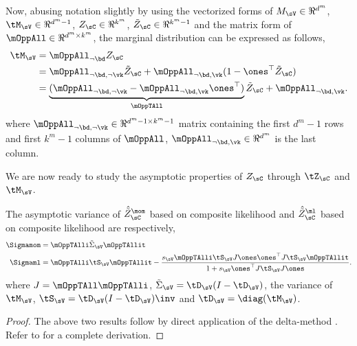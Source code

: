 Now, abusing notation slightly by using the vectorized forms of $M_\sV
\in \Re^{d^m}$, $\tM_\sV \in \Re^{d^m-1}$, $Z_\sC \in \Re^{k^m}$, $\tilde Z_\sC \in \Re^{k^m-1}$
and the matrix form of $\mOppAll \in \Re^{d^m \times k^m}$, the marginal
distribution can be expressed as follows,
\begin{align*}
  \tM_\sV 
        &= \mOppAll_{\neg \bd} Z_\sC \\
        &= \mOppAll_{\neg \bd, \neg \vk} \tilde Z_\sC + \mOppAll_{\neg \bd, \vk} (1 - \ones^\top \tilde Z_\sC) \\
        &= \underbrace{(\mOppAll_{\neg \bd, \neg \vk} -  \mOppAll_{\neg \bd, \vk}\ones^\top)}_{\mOppTAll} \tilde Z_\sC + \mOppAll_{\neg \bd, \vk}.
\end{align*}
where $\mOppAll_{\neg \bd, \neg \vk} \in \Re^{d^m -1 \times k^m - 1}$ matrix containing the
first $d^m-1$ rows and first $k^m-1$ columns of $\mOppAll$, $\mOppAll_{\neg \bd, \vk} \in \Re^{d^m}$ is the last column. 

We are now ready to study the asymptotic properties of $Z_\sC$ through
$\tZ_\sC$ and $\tM_\sV$.

\providecommand{\hatt}[1] {\hat{\tilde{#1}}}
\begin{lemma}
  \label{lem:mom-pw-variance}
  The asymptotic variance of $\hatt Z^\mom_{\sC}$ based on composite likelihood and 
  $\hatt Z^\ml_{\sC}$ based on composite likelihood are respectively,
  \begin{align*}
    \Sigmamom &= \mOppTAlli \tilde\Sigma_\sV \mOppTAllit \\
    \Sigmaml 
    &= \mOppTAlli \tS_\sV \mOppTAllit 
      - \frac{s_\sV \mOppTAlli \tS_\sV J \ones \ones^\top J \tS_\sV \mOppTAllit }
      {1 + s_\sV \ones^\top J \tS_\sV J \ones}.
  \end{align*}
  where $J = \mOppTAll \mOppTAlli$, $\tilde \Sigma_\sV = \tD_\sV (I
  - \tD_\sV)$, the variance of $\tM_\sV$, $\tS_\sV = \tD_\sV (I
  - \tD_\sV)\inv$ and $\tD_\sV = \diag(\tM_\sV)$.
\end{lemma}
\begin{proof}
  The above two results follow by direct application of the delta-method
  \cite{vaart98asymptotic}. Refer to  for
  a complete derivation.
\end{proof}


